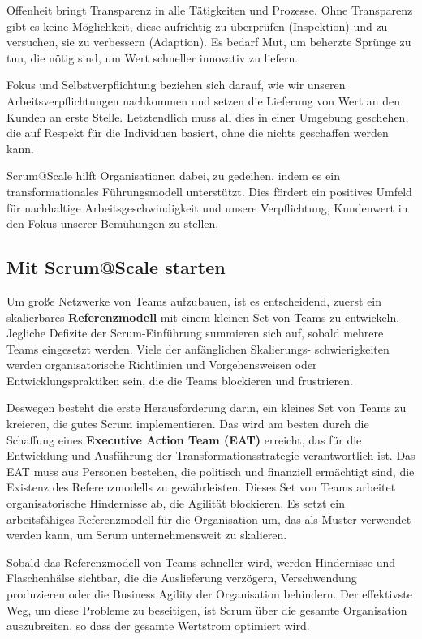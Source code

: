 \documentclass[12pt,a4paper,parskip=full]{scrartcl}
\begin{document}
Offenheit bringt Transparenz in alle Tätigkeiten und Prozesse. Ohne Transparenz
gibt es keine Möglichkeit, diese aufrichtig zu überprüfen (Inspektion) und zu
versuchen, sie zu verbessern (Adaption). Es bedarf Mut, um beherzte Sprünge zu
tun, die nötig sind, um Wert schneller innovativ zu liefern.

Fokus und Selbstverpflichtung beziehen sich darauf, wie wir unseren
Arbeitsverpflichtungen nachkommen und setzen die Lieferung von Wert an den
Kunden an erste Stelle. Letztendlich muss all dies in einer Umgebung
geschehen, die auf Respekt für die Individuen basiert, ohne die nichts
geschaffen werden kann.

Scrum@Scale hilft Organisationen dabei, zu gedeihen, indem es ein
transformationales Führungsmodell unterstützt. Dies fördert ein positives
Umfeld für nachhaltige Arbeitsgeschwindigkeit und unsere Verpflichtung,
Kundenwert in den Fokus unserer Bemühungen zu stellen.

\subsection{Mit Scrum@Scale starten}
Um große Netzwerke von Teams aufzubauen, ist es entscheidend, zuerst ein
skalierbares \textbf{Referenzmodell} mit einem kleinen Set von Teams zu
entwickeln. Jegliche Defizite der Scrum-Einführung summieren sich auf, sobald
mehrere Teams eingesetzt werden. Viele der anfänglichen Skalierungs-
schwierigkeiten werden organisatorische Richtlinien und Vorgehensweisen oder
Entwicklungspraktiken sein, die die Teams blockieren und frustrieren.

Deswegen besteht die erste Herausforderung darin, ein kleines Set von Teams
zu kreieren, die gutes Scrum implementieren. Das wird am besten durch die
Schaffung eines \textbf{Executive Action Team (EAT)} erreicht, das für die
Entwicklung und Ausführung der Transformationsstrategie verantwortlich ist.
Das EAT muss aus Personen bestehen, die politisch und finanziell ermächtigt
sind, die Existenz des Referenzmodells zu gewährleisten. Dieses Set von Teams
arbeitet organisatorische Hindernisse ab, die Agilität blockieren. Es setzt
ein arbeitsfähiges Referenzmodell für die Organisation um, das als Muster
 verwendet werden kann, um Scrum unternehmensweit zu skalieren.

Sobald das Referenzmodell von Teams schneller wird, werden Hindernisse und
Flaschenhälse sichtbar, die die Auslieferung verzögern, Verschwendung produzieren
oder die Business Agility der Organisation behindern. Der effektivste Weg, um
diese Probleme zu beseitigen, ist Scrum über die gesamte Organisation
auszubreiten, so dass der gesamte Wertstrom optimiert wird.
\end{document}

